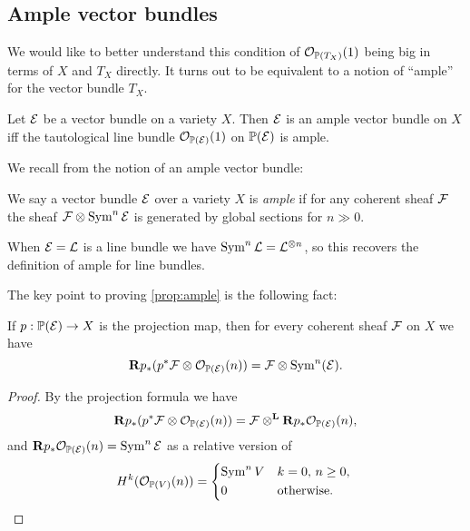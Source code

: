 \subsection{Ample vector bundles}

We would like to better understand this condition of $\mathcal{O}_{\mathbb{P}(T_X)}(1)$ being
big in terms of $X$ and $T_X$ directly. It turns out to be equivalent to a
notion of ``ample'' for the vector bundle $T_X$.

\begin{proposition} \label{prop:ample}
    Let $\mathcal{E}$ be a vector bundle on a variety $X$. Then $\mathcal{E}$ is an ample
    vector bundle on $X$ iff the tautological line bundle $\mathcal{O}_{\mathbb{P}(\mathcal{E})}(1)$ on
    $\mathbb{P}(\mathcal{E})$ is ample.
\end{proposition}

We recall from \cite{hartshorne_66} the notion of an ample vector bundle:

\begin{definition}
    We say a vector bundle $\mathcal{E}$ over a variety $X$ is \emph{ample} if for any
    coherent sheaf $\mathcal{F}$ the sheaf $\mathcal{F}\otimes\operatorname{Sym}^n\mathcal{E}$ is generated by
    global sections for $n\gg0$.
\end{definition}

\begin{remark}
    When $\mathcal{E}=\mathcal{L}$ is a line bundle we have $\operatorname{Sym}^n\mathcal{L}=\mathcal{L}^{\otimes n}$,
    so this recovers the definition of ample for line bundles.
\end{remark}

The key point to proving \cref{prop:ample} is the following fact:

\begin{lemma}
    If $p:\mathbb{P}(\mathcal{E})\to X$ is the projection map, then for every coherent sheaf
    $\mathcal{F}$ on $X$ we have
    \begin{equation*}
        \mathbf{R} p_*(p^*\mathcal{F}\otimes\mathcal{O}_{\mathbb{P}(\mathcal{E})}(n))
            = \mathcal{F}\otimes\operatorname{Sym}^n(\mathcal{E}).
    \end{equation*}
\end{lemma}

\begin{proof}
    By the projection formula we have
    \begin{equation*}
        \mathbf{R} p_*(p^*\mathcal{F}\otimes\mathcal{O}_{\mathbb{P}(\mathcal{E})}(n))
            = \mathcal{F}\otimes^{\mathbf{L}}\mathbf{R} p_*\mathcal{O}_{\mathbb{P}(\mathcal{E})}(n),
    \end{equation*}
    and $\mathbf{R} p_*\mathcal{O}_{\mathbb{P}(\mathcal{E})}(n)=\operatorname{Sym}^n\mathcal{E}$ as a relative version of
    \begin{equation*}
        H^k(\O_{\P(V)}(n)) = \begin{dcases*}
            \Sym^nV & $k=0$, $n\ge0$, \\ %
            0 & otherwise.
        \end{dcases*}
    \end{equation*}
\end{proof}

